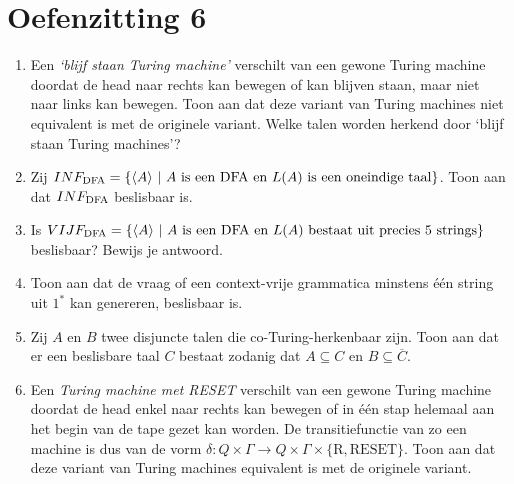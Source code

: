 \documentclass[a4paper]{article}
\begin{document}
\pagestyle{empty}

\section*{Oefenzitting 6}


\begin{enumerate}
\item Een \emph{`blijf staan Turing machine'} verschilt van een gewone Turing machine doordat de head naar rechts kan bewegen of kan blijven staan, maar niet naar links kan bewegen. Toon aan dat deze variant van Turing machines niet equivalent is met de originele variant. Welke talen worden herkend door `blijf staan Turing machines'?
\item Zij $INF_{\rm DFA} = \{ \langle A \rangle \ | \ \text{$A$ is een DFA en $L(A)$ is een oneindige taal} \} $. Toon aan dat $INF_{\rm DFA}$ beslisbaar is.
\item Is $VIJF_{\rm DFA} = \{ \langle A \rangle \ | \ \text{$A$ is een DFA en $L(A)$ bestaat uit precies 5 strings} \} $ beslisbaar? Bewijs je antwoord.
\item Toon aan dat de vraag of een context-vrije grammatica minstens \'e\'en string uit $1^*$ kan genereren, beslisbaar is.
\item Zij $A$ en $B$ twee disjuncte talen die co-Turing-herkenbaar zijn. Toon aan dat er een beslisbare taal $C$ bestaat zodanig dat $A \subseteq C$ en $B \subseteq \overline{C}$. 
\item Een \emph{Turing machine met RESET} verschilt van een gewone Turing machine doordat de head enkel naar rechts kan bewegen of in \'e\'en stap helemaal aan het begin van de tape gezet kan worden. De transitiefunctie van zo een machine is dus van de vorm $\delta : Q \times \Gamma \to Q \times \Gamma \times \{ \text{R}, \text{RESET} \}$. Toon aan dat deze variant van Turing machines equivalent is met de originele variant.
\end{enumerate}
\end{document}
